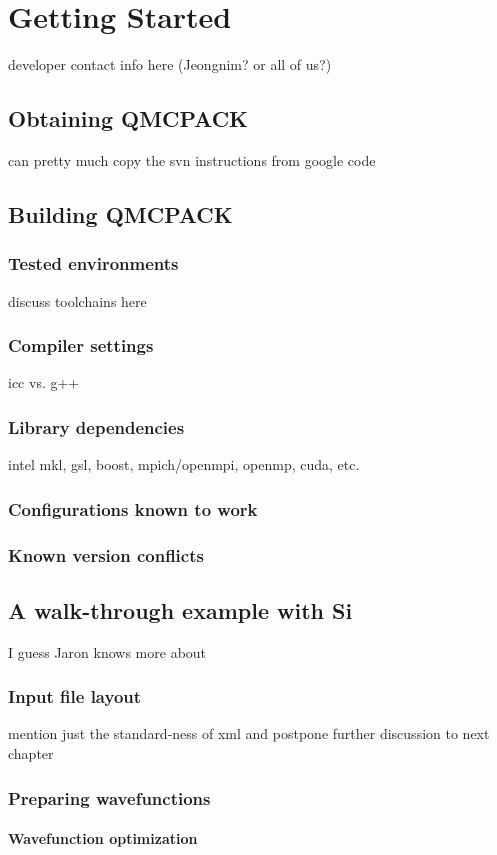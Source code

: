 \chapter{Getting Started}
developer contact info here (Jeongnim? or all of us?)
\section{Obtaining QMCPACK}
can pretty much copy the svn instructions from google code
\section{Building QMCPACK}
\subsection{Tested environments}
discuss toolchains here
\subsection{Compiler settings}
icc vs. g++
\subsection{Library dependencies}
intel mkl, gsl, boost, mpich/openmpi, openmp, cuda, etc.
\subsection{Configurations known to work}
\subsection{Known version conflicts}
\section{A walk-through example with Si}
I guess Jaron knows more about 
\subsection{Input file layout}
mention just the standard-ness of xml and postpone further discussion to next chapter
\subsection{Preparing wavefunctions}
\subsubsection{Wavefunction optimization}
